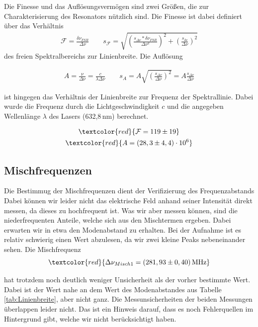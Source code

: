 Die Finesse und das Auflösungsvermögen sind zwei Größen, die zur Charakterisierung des Resonators nützlich sind. Die Finesse ist dabei
definiert über das Verhältnis 
\begin{align}
    \mathcal{F} = \frac{\delta \nu_{FSR}}{\Delta\nu} \qquad s_{\mathcal{F}} = \sqrt{(\frac{s_{\Delta \nu}*\delta \nu_{FSR}}{\Delta\nu^2})^2+(\frac{s_{\delta\nu}}{\Delta \nu})^2}
\end{align}
 des freien Spektralbereichs zur Linienbreite. Die Auflösung 

 \begin{align}
     A = \frac{\nu}{\Delta\nu} = \frac{c}{\lambda\Delta\nu} \qquad s_A = A\sqrt{(\frac{s_{\Delta\nu}}{\Delta\nu})^2} = A\frac{s_{\Delta\nu}}{\Delta\nu}
 \end{align}
 
 ist hingegen das Verhältnis der Linienbreite zur Frequenz der Spektrallinie. Dabei wurde die Frequenz durch
 die Lichtgeschwindigkeit $c$ und die angegeben Wellenlänge $\lambda$ des Lasers (632,8\,nm) berechnet. 
 
 \begin{gather}
    \textcolor{red}{\mathcal{F} = 119\pm19}\\
    \textcolor{red}{A = (28,3\pm4,4)\cdot10^6}
 \end{gather}


 \subsection*{Mischfrequenzen}

 Die Bestimmug der Mischfrequenzen dient der Verifizierung des Frequenzabstands 
 Dabei können wir leider nicht das elektrische Feld anhand seiner Intensität direkt messen, da dieses zu hochfrequent ist. Was wir aber messen können, sind 
 die niederfrequenten Anteile, welche sich aus den Mischtermen ergeben. Dabei erwarten wir in etwa den Modenabstand zu erhalten. 
 Bei der Aufnahme ist es relativ schwierig einen Wert abzulesen, da wir zwei kleine Peaks nebeneinander sehen. Die Mischfrequenz 
 \begin{equation*}
     \textcolor{red}{\Delta \nu_{Misch1} = (281,93\pm0,40)\,\mathrm{MHz} }
 \end{equation*}

 hat trotzdem noch deutlich weniger Unsicherheit als der vorher bestimmte Wert. Dabei ist der Wert nahe an dem Wert des 
 Modenabstandes aus Tabelle \ref{tab:Linienbreite}, aber nicht ganz. Die Messunsicherheiten der beiden Messungen überlappen leider nicht. Das ist ein Hinweis darauf, dass es noch Fehlerquellen im Hintergrund gibt, welche wir nicht
 berücksichtigt haben.

